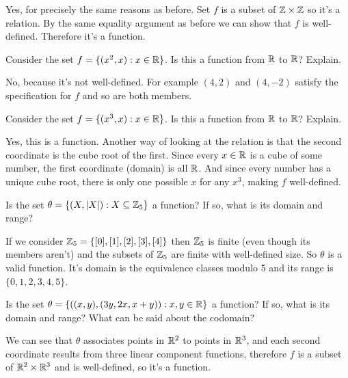 \documentclass{article}
\begin{document}
Yes, for precisely the same reasons as before. Set $f$ is a subset of $\mathbb{Z} \times \mathbb{Z}$ so it's a relation. By the same equality argument as before we can show that $f$ is well-defined. Therefore it's a function.

\begin{problem}
Consider the set $f = \{(x^2, x): x \in \mathbb{R}\}$. Is this a function from $\mathbb{R}$ to $\mathbb{R}$? Explain.
\end{problem}

No, because it's not well-defined. For example $(4, 2)$ and $(4, -2)$ satisfy the specification for $f$ and so are both members.

\begin{problem}
Consider the set $f = \{(x^3, x): x \in \mathbb{R}\}$. Is this a function from $\mathbb{R}$ to $\mathbb{R}$? Explain.
\end{problem}

Yes, this is a function. Another way of looking at the relation is that the second coordinate is the cube root of the first. Since every $x \in \mathbb{R}$ is a cube of some number, the first coordinate (domain) is all $\mathbb{R}$. And since every number has a unique cube root, there is only one possible $x$ for any $x^3$, making $f$ well-defined.

\begin{problem}
Is the set $\theta = \{(X, |X|): X \subseteq \mathbb{Z}_5\}$ a function? If so, what is its domain and range?
\end{problem}

If we consider $\mathbb{Z}_5 = \{[0], [1], [2], [3], [4]\}$ then $\mathbb{Z}_5$ is finite (even though its members aren't) and the subsets of $\mathbb{Z}_5$ are finite with well-defined size. So $\theta$ is a valid function. It's domain is the equivalence classes modulo 5 and its range is $\{0, 1, 2, 3, 4, 5\}$.

\begin{problem}
Is the set $\theta = \{\left((x, y), (3y, 2x, x + y)\right): x, y \in \mathbb{R}\}$ a function? If so, what is its domain and range? What can be said about the codomain?
\end{problem}

We can see that $\theta$ associates points in $\mathbb{R}^2$ to points in $\mathbb{R}^3$, and each second coordinate results from three linear component functions, therefore $f$ is a subset of $\mathbb{R}^2 \times \mathbb{R}^3$ and is well-defined, so it's a function.
\end{document}
